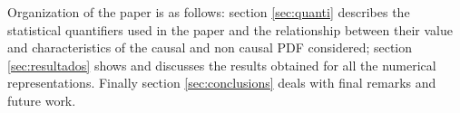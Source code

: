 Organization of the paper is as follows:
section \ref{sec:quanti} describes the statistical quantifiers used in the paper and the relationship between their value and characteristics of the causal and non causal PDF considered;
section \ref{sec:resultados} shows and discusses the results obtained for all the numerical representations.
Finally section \ref{sec:conclusions} deals with final remarks and future work.